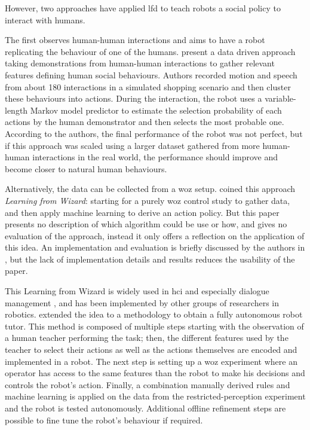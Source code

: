 	However, two approaches have applied \gls{lfd} to teach robots a social policy to interact with humans.
	
	The first observes human-human interactions and aims to have a robot replicating the behaviour of one of the humans. \citet{liu2014train} present a data driven approach taking demonstrations from human-human interactions to gather relevant features defining human social behaviours. Authors recorded motion and speech from about 180 interactions in a simulated shopping scenario and then cluster these behaviours into actions. During the interaction, the robot uses a variable-length Markov model predictor to estimate the selection probability of each actions by the human demonstrator and then selects the most probable one. According to the authors, the final performance of the robot was not perfect, but if this approach was scaled using a larger dataset gathered from more human-human interactions in the real world, the performance should improve and become closer to natural human behaviours.
    
    Alternatively, the data can be collected from a \acrlong{woz} setup. \cite{knox2014learning} coined this approach \emph{Learning from Wizard}: starting for a purely \gls{woz} control study to gather data, and then apply machine learning to derive an action policy. But this paper presents no description of which algorithm could be use or how, and gives no evaluation of the approach, instead it only offers a reflection on the application of this idea. An implementation and evaluation is briefly discussed by the authors in \cite{knox2016learning}, but the lack of implementation details and results reduces the usability of the paper.
    
    This Learning from Wizard is widely used in \gls{hci} and especially dialogue management \citep{rieser2008learning}, and has been implemented by other groups of researchers in robotics. \citet{sequeira2016discovering} extended the idea to a methodology to obtain a fully autonomous robot tutor. This method is composed of multiple steps starting with the observation of a human teacher performing the task; then, the different features used by the teacher to select their actions as well as the actions themselves are encoded and implemented in a robot. The next step is setting up a \gls{woz} experiment where an operator has access to the same features than the robot to make his decisions and controls the robot's action. Finally, a combination manually derived rules and machine learning is applied on the data from the restricted-perception experiment and the robot is tested autonomously. Additional offline refinement steps are possible to fine tune the robot's behaviour if required. 
    
